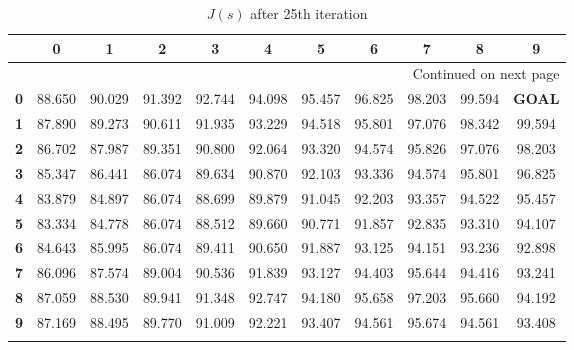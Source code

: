 \documentclass{article}
\begin{document}
\begin{longtable}{|c|c|c|c|c|c|c|c|c|c|c|}
\toprule
{} &       0 &       1 &       2 &       3 &       4 &       5 &       6 &       7 &       8 &       9 \\
\midrule
\endhead
\midrule
\multicolumn{11}{r}{{Continued on next page}} \\
\midrule
\endfoot

\bottomrule
\endlastfoot
\textbf{0} &  88.650 &  90.029 &  91.392 &  92.744 &  94.098 &  95.457 &  96.825 &  98.203 &  99.594 &   \textbf{GOAL} \\\hline
\textbf{1} &  87.890 &  89.273 &  90.611 &  91.935 &  93.229 &  94.518 &  95.801 &  97.076 &  98.342 &  99.594 \\\hline
\textbf{2} &  86.702 &  87.987 &  89.351 &  90.800 &  92.064 &  93.320 &  94.574 &  95.826 &  97.076 &  98.203 \\\hline
\textbf{3} &  85.347 &  86.441 &  86.074 &  89.634 &  90.870 &  92.103 &  93.336 &  94.574 &  95.801 &  96.825 \\\hline
\textbf{4} &  83.879 &  84.897 &  86.074 &  88.699 &  89.879 &  91.045 &  92.203 &  93.357 &  94.522 &  95.457 \\\hline
\textbf{5} &  83.334 &  84.778 &  86.074 &  88.512 &  89.660 &  90.771 &  91.857 &  92.835 &  93.310 &  94.107 \\\hline
\textbf{6} &  84.643 &  85.995 &  86.074 &  89.411 &  90.650 &  91.887 &  93.125 &  94.151 &  93.236 &  92.898 \\\hline
\textbf{7} &  86.096 &  87.574 &  89.004 &  90.536 &  91.839 &  93.127 &  94.403 &  95.644 &  94.416 &  93.241 \\\hline
\textbf{8} &  87.059 &  88.530 &  89.941 &  91.348 &  92.747 &  94.180 &  95.658 &  97.203 &  95.660 &  94.192 \\\hline
\textbf{9} &  87.169 &  88.495 &  89.770 &  91.009 &  92.221 &  93.407 &  94.561 &  95.674 &  94.561 &  93.408 \\\hline
\caption{$J(s)$ after 25th iteration}
\end{longtable}
\end{document}
